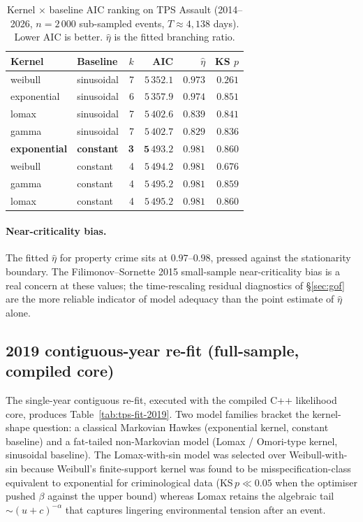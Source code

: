 \documentclass[article,shortnames,nojss]{jss}
\newcommand{\1}{\mathbbm{1}}
\theoremstyle{plain}
\theoremstyle{definition}
\begin{document}
\begin{table}[h]
\centering\footnotesize
\caption{Kernel $\times$ baseline AIC ranking on TPS Assault
(2014--2026, $n=2\,000$ sub-sampled events, $T\approx 4{,}138$ days).
Lower AIC is better.  $\hat\eta$ is the fitted branching ratio.}
\label{tab:tps-fit}
\begin{tabular}{llrrrr}
\toprule
Kernel & Baseline & $k$ & AIC & $\hat\eta$ & KS $p$\\\midrule
weibull        & sinusoidal & 7 & $5\,352.1$ & $0.973$ & $0.261$\\
exponential    & sinusoidal & 6 & $5\,357.9$ & $0.974$ & $0.851$\\
lomax          & sinusoidal & 7 & $5\,402.6$ & $0.839$ & $0.841$\\
gamma          & sinusoidal & 7 & $5\,402.7$ & $0.829$ & $0.836$\\
\textbf{exponential} & \textbf{constant}   & \textbf{3} & $\mathbf{5\,493.2}$ & $\mathbf{0.981}$ & $\mathbf{0.860}$\\
weibull        & constant   & 4 & $5\,494.2$ & $0.981$ & $0.676$\\
gamma          & constant   & 4 & $5\,495.2$ & $0.981$ & $0.859$\\
lomax          & constant   & 4 & $5\,495.2$ & $0.981$ & $0.860$\\
\bottomrule
\end{tabular}
\end{table}

\paragraph{Near-criticality bias.}
The fitted $\hat\eta$ for property crime sits at $0.97$--$0.98$, pressed against the stationarity boundary.  The Filimonov--Sornette 2015 \citep{filimonov2015apparent} small-sample near-criticality bias is a real concern at these values; the time-rescaling residual diagnostics of §\ref{sec:gof} are the more reliable indicator of model adequacy than the point estimate of $\hat\eta$ alone.

\subsection{2019 contiguous-year re-fit (full-sample, compiled core)}\label{sec:application-2019}

The single-year contiguous re-fit, executed with the compiled C++
likelihood core, produces Table~\ref{tab:tps-fit-2019}.
Two model families bracket the kernel-shape question: a
classical Markovian Hawkes (exponential kernel, constant
baseline) and a fat-tailed non-Markovian model (Lomax /
Omori-type kernel, sinusoidal baseline).  The Lomax-with-sin
model was selected over Weibull-with-sin because Weibull's
finite-support kernel was found to be misspecification-class
equivalent to exponential for criminological data
(KS\,$p \ll 0.05$ when the optimiser pushed $\beta$ against
the upper bound) whereas Lomax retains the algebraic tail
$\sim (u+c)^{-\alpha}$ that captures lingering environmental
tension after an event.
\end{document}
